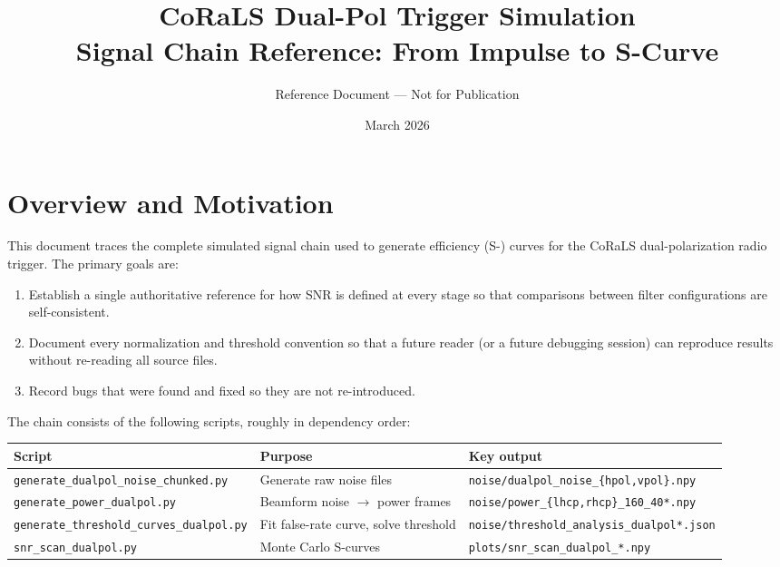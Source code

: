 \documentclass[11pt,letterpaper]{article}
\title{\textbf{CoRaLS Dual-Pol Trigger Simulation}\\\large Signal Chain Reference: From Impulse to S-Curve}
\author{Reference Document --- Not for Publication}
\date{March 2026}
\begin{document}
\maketitle
\tableofcontents
\newpage

\section{Overview and Motivation}

This document traces the complete simulated signal chain used to generate
efficiency (S-) curves for the CoRaLS dual-polarization radio trigger. The
primary goals are:

\begin{enumerate}[nosep]
  \item Establish a single authoritative reference for how SNR is defined at
        every stage so that comparisons between filter configurations are
        self-consistent.
  \item Document every normalization and threshold convention so that a future
        reader (or a future debugging session) can reproduce results without
        re-reading all source files.
  \item Record bugs that were found and fixed so they are not re-introduced.
\end{enumerate}

The chain consists of the following scripts, roughly in dependency order:

\begin{center}
\begin{tabular}{lll}
\toprule
Script & Purpose & Key output \\
\midrule
\texttt{generate\_dualpol\_noise\_chunked.py} & Generate raw noise files & \texttt{noise/dualpol\_noise\_\{hpol,vpol\}.npy} \\
\texttt{generate\_power\_dualpol.py}           & Beamform noise $\to$ power frames  & \texttt{noise/power\_\{lhcp,rhcp\}\_160\_40*.npy} \\
\texttt{generate\_threshold\_curves\_dualpol.py} & Fit false-rate curve, solve threshold & \texttt{noise/threshold\_analysis\_dualpol*.json} \\
\texttt{snr\_scan\_dualpol.py}                 & Monte Carlo S-curves & \texttt{plots/snr\_scan\_dualpol\_*.npy} \\
\bottomrule
\end{tabular}
\end{center}
\end{document}
